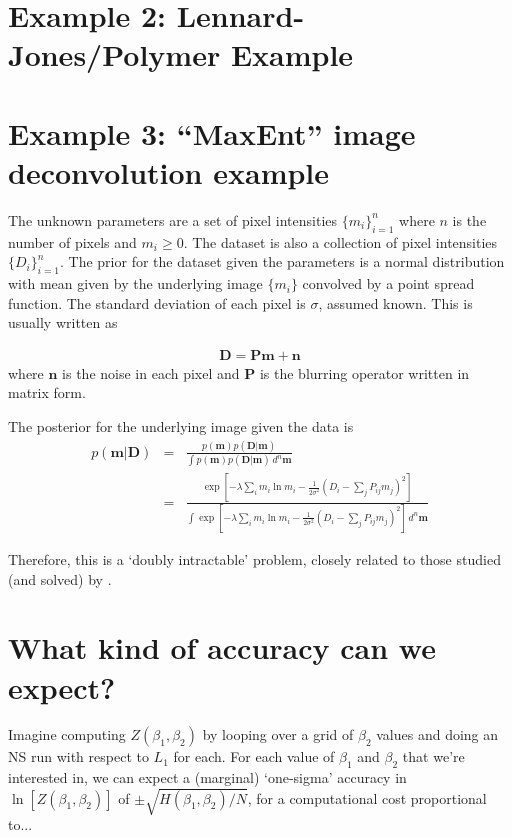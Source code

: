\documentclass[journal,article,accept,moreauthors,pdftex,12pt,a4paper]{mdpi}
\begin{document}
\section{Example 2: Lennard-Jones/Polymer Example}



\section{Example 3: ``MaxEnt'' image deconvolution example}

The unknown parameters are a set of pixel intensities
$\{m_i\}_{i=1}^n$ where $n$ is the number of pixels and $m_i \geq 0$.
The dataset is also a collection of pixel intensities $\{D_i\}_{i=1}^n$.
The prior for the dataset given the parameters is a normal distribution
with mean given by the underlying image $\{m_i\}$ convolved by
a point spread function. The standard deviation of each pixel is
$\sigma$, assumed known. This is usually written as

\begin{eqnarray}
\boldsymbol{D} = \boldsymbol{P}\boldsymbol{m} + \boldsymbol{n}
\end{eqnarray}
where $\boldsymbol{n}$ is the noise in each pixel and $\boldsymbol{P}$ is
the blurring operator written in matrix form.

The posterior for the underlying image given the data is
\begin{eqnarray}
p(\boldsymbol{m} | \boldsymbol{D})
&=& \frac{p(\boldsymbol{m})p(\boldsymbol{D}|\boldsymbol{m})}
{\int p(\boldsymbol{m})p(\boldsymbol{D}|\boldsymbol{m}) \,d^n\boldsymbol{m}}\\
&=& \frac{\exp\left[-\lambda \sum_i m_i\ln m_i
-\frac{1}{2\sigma^2}\left(D_i - \sum_{j} P_{ij}m_{j}\right)^2\right]}
{\int \exp\left[-\lambda \sum_i m_i\ln m_i
-\frac{1}{2\sigma^2}\left(D_i - \sum_{j} P_{ij}m_{j}\right)^2\right]\, d^n\boldsymbol{m}}
\end{eqnarray}


Therefore, this is a `doubly intractable' problem, closely related to
those studied (and solved) by \citep{murray}.

\section{What kind of accuracy can we expect?}

Imagine computing $Z(\beta_1, \beta_2)$ by looping over a grid of $\beta_2$
values and doing an NS run with respect to $L_1$ for each. For each
value of $\beta_1$ and $\beta_2$ that we're interested in, we can expect
a (marginal) `one-sigma' accuracy in
$\ln\left[Z(\beta_1, \beta_2)\right]$ of $\pm \sqrt{H(\beta_1, \beta_2)/N}$,
for a computational cost proportional to...
\end{document}

